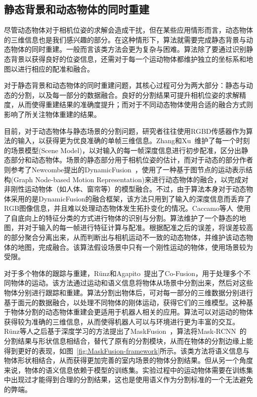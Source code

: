 \subsection{静态背景和动态物体的同时重建}
\label{subsec:static_and_dynamic}
\newpage
尽管动态物体对于相机位姿的求解会造成干扰，但在某些应用情形而言，动态物体的三维信息也是我们感兴趣的部分。在这种情形下，算法就需要完成静态背景与动态物体的同时重建。一般而言该类方法会更为复杂与困难。算法除了要通过识别静态背景以获得良好的位姿信息，还需对于每一个运动物体都维护独立的坐标系和地图以进行相应的配准和融合。

对于静态背景和动态物体的同时重建问题，其核心过程可分为两大部分：静态与动态的分割，以及每一部分的数据融合。良好的分割结果可提升相机位姿的求解精度，从而使得重建结果的准确度提升；而对于不同动态物体使用合适的融合方式则影响了所关注物体重建的结果。

目前，对于动态物体与静态场景的分割问题，研究者往往使用RGBD传感器作为算法的输入，以获得更为优良准确的单帧三维信息。Zhang和Xu~\cite{2017MixedFusion}维护了每一个时刻的场景模型(Scene Model)，以对输入的每一帧深度信息进行初步配准，区分出静态部分和动态物体。场景的静态部分用于相机位姿的估计，而对于动态的部分作者则参考了Newcombe提出的DynamicFusion~\cite{2015DynamicFusion}，使用了一种基于图节点的运动表示结构(Graph Node-based Motion Representation)来进行动态物体的融合，以完成对非刚性运动物体（如人体、窗帘等）的模型融合。不过，由于算法本身对于动态物体采用的是DynamicFusion的融合框架，该方法只用到了输入的深度信息而丢弃了RGB图像信息，并且难以处理动态物体发生拓扑变化的情况。Caccamo等人~\cite{2017Joint3D}使用了自底向上的特征分类的方式进行物体的识别与分割。算法维护了一个静态的地图，并对于输入的每一帧进行特征计算与配准。根据配准之后的误差，将误差较高的部分聚合分离出来，从而判断出与相机运动不一致的动态物体，并维护该动态物体的地图，完成融合。该算法假设场景中只有一个刚性运动的物体，使用场景较为受限。


对于多个物体的跟踪与重建，R\"unz和Agapito~\cite{2017CoFusion}提出了Co-Fusion，用于处理多个不同物体的运动。该方法通过运动和语义信息将物体从场景中分割出来，然后对这些物体分别进行跟踪和重建。算法分割出物体后，可对每一部分的三维数据分别进行基于面元的数据融合，以处理不同物体的刚体运动，获得它们的三维模型。这种基于物体分割的动态物体重建会更适用于机器人相关的应用。算法可以对运动的物体获得较为准确的三维信息，从而使得机器人可以与环境进行更为丰富的交互。R\"unz等人之后基于深度学习的方法提出了MaskFusion~\cite{2018MaskFusion}，算法将Mask-RCNN~\cite{2017MaskRCNN}的分割结果与形状信息相结合，替代了原有的分割模块，从而在物体的分割边缘上能得到更好的表现，如图~\ref{fig:MaskFusion-framework}所示。该类方法将语义信息与物体形状相结合，从而获得更加完善的室内场景的物体分割结果。但从另一个角度来说，物体的语义信息依赖于模型的训练集。实验过程中的运动物体需要在训练集中出现过才能得到合理的分割结果，这也是使用语义作为分割标准的一个无法避免的弊端。

